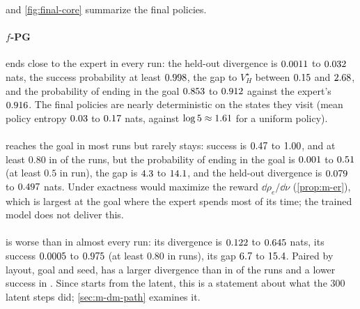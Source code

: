  and \cref{fig:final-core} summarize the final policies.

\paragraph{$f$-PG} ends close to the expert in every run: the held-out divergence is $\vn{s11.fpg.js.lo}{0.0011}$ to $\vn{s11.fpg.js.hi}{0.032}$ nats, the success probability at least $\vn{s11.fpg.succ_min}{0.998}$, the gap to $V^\star_H$ between $\vn{s11.fpg.gap.lo}{0.15}$ and $\vn{s11.fpg.gap.hi}{2.68}$, and the probability of ending in the goal $\vn{s11.fpg.fig.lo}{0.853}$ to $\vn{s11.fpg.fig.hi}{0.912}$ against the expert's $\vn{s11.expert_fig}{0.916}$.
The final policies are nearly deterministic on the states they visit (mean policy entropy $\vn{s11.fpg.ent.lo}{0.03}$ to $\vn{s11.fpg.ent.hi}{0.17}$ nats, against $\log5\approx\vn{const.log5}{1.61}$ for a uniform policy).

\paragraph{\ERFB} reaches the goal in most runs but rarely stays: success is $\vn{s11.er.succ.lo}{0.47}$ to $\vn{s11.er.succ.hi}{1.00}$, and at least $0.80$ in  of the  runs, but the probability of ending in the goal is $\vn{s11.er.fig.lo}{0.001}$ to $\vn{s11.er.fig.hi}{0.51}$ (at least $0.5$ in  run), the gap is $\vn{s11.er.gap.lo}{4.3}$ to $\vn{s11.er.gap.hi}{14.1}$, and the held-out divergence is $\vn{s11.er.js.lo}{0.079}$ to $\vn{s11.er.js.hi}{0.497}$ nats.
Under exactness \ERFB{} would maximize the reward $\dd\rho_e/\dd\nu$ (\cref{prop:m-er}), which is largest at the goal where the expert spends most of its time; the trained model does not deliver this.

\paragraph{\DMFB} is worse than \ERFB{} in almost every run: its divergence is $\vn{s11.dm.js.lo}{0.122}$ to $\vn{s11.dm.js.hi}{0.645}$ nats, its success $\vn{s11.dm.succ.lo}{0.0005}$ to $\vn{s11.dm.succ.hi}{0.975}$ (at least $0.80$ in  runs), its gap $\vn{s11.dm.gap.lo}{6.7}$ to $\vn{s11.dm.gap.hi}{15.4}$.
Paired by layout, goal and seed, \DMFB{} has a larger divergence than \ERFB{} in  of the  runs and a lower success in . Since \DMFB{} starts from the \ERFB{} latent, this is a statement about what the 300 latent steps did; \cref{sec:m-dm-path} examines it.

